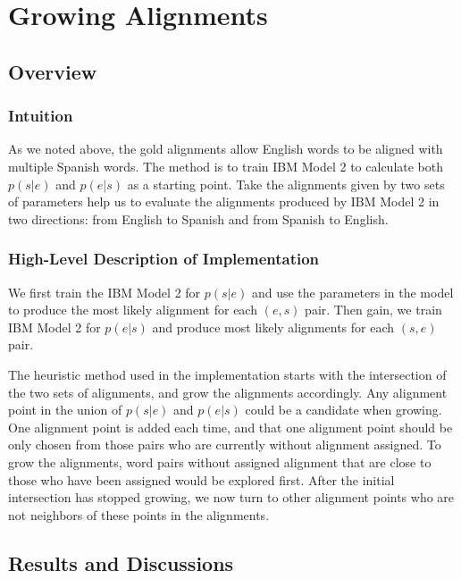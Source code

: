 \section{\textbf{Growing Alignments}}

\subsection{\textbf{Overview}}

\subsubsection{\textbf{Intuition}}

As we noted above, the gold alignments allow English words to be aligned with multiple Spanish words. The method is to train IBM Model 2 to calculate both $p(s|e)$ and $p(e|s)$ as a starting point. Take the alignments given by two sets of parameters help us to evaluate the alignments produced by IBM Model 2 in two directions: from English to Spanish and from Spanish to English. 

\subsubsection{\textbf{High-Level Description of Implementation}}

We first train the IBM Model 2 for $p(s|e)$ and use the parameters in the model to produce the most likely alignment for each $(e,s)$ pair. Then gain, we train IBM Model 2 for $p(e|s)$ and produce most likely alignments for each $(s, e)$ pair.

The heuristic method used in the implementation starts with the intersection of the two sets of alignments, and grow the alignments accordingly. Any alignment point in the union of $p(s|e)$ and $p(e|s)$ could be a candidate when growing. One alignment point is added each time, and that one alignment point should be only chosen from those pairs who are currently without alignment assigned. To grow the alignments, word pairs without assigned alignment that are close to those who have been assigned would be explored first. After the initial intersection has stopped growing, we now turn to other alignment points who are not neighbors of these points in the alignments.

\subsection{\textbf{Results and Discussions}}

